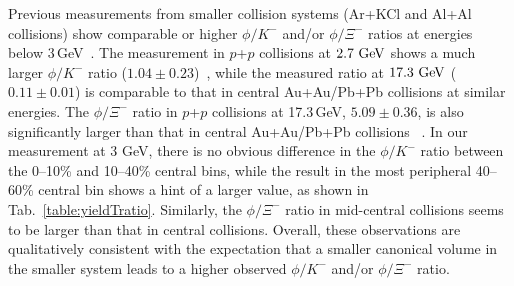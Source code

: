 \documentclass[%
 reprint,	
showpacs,
 amsmath,amssymb,
 aps,
 superscriptaddress,
]{revtex4-1}
\begin{document}
Previous measurements from smaller collision systems (Ar+KCl and Al+Al collisions) show comparable or higher $\phi/K^-$ and/or $\phi/\Xi^-$ ratios at energies below 3\,GeV~\cite{FOPI_phi_AlAl,FOPI_phi_NiNi,HADES_phi_ArKCl,Xi_ArKCl_HADES}. The measurement in $p$+$p$ collisions at $\textup{2.7 GeV}$ shows a much larger $\phi/K^-$ ratio ($1.04\pm0.23$)~\cite{ANKE_phi}, while the measured ratio at $\textup{17.3 GeV}$ ($0.11\pm0.01$) is comparable to that in central Au+Au/Pb+Pb collisions at similar energies. The $\phi/\Xi^-$ ratio in $p$+$p$ collisions at 17.3\,GeV, $5.09\pm0.36$, is also significantly larger than that in central Au+Au/Pb+Pb collisions ~\cite{NA61SHINE_pp_piKp,NA61SHINE_pp_phi,NA61SHINE_pp_Xi}. In our measurement at 3 GeV, there is no obvious difference in the $\phi/K^-$ ratio between the \textup{0--10\%} and \textup{10--40\%} central bins, while the result in the most peripheral 40--60\% central bin shows a hint of a larger value, as shown in Tab.~\ref{table:yieldTratio}. Similarly, the $\phi/\Xi^-$ ratio in mid-central collisions seems to be larger than that in central collisions. Overall, these observations are qualitatively consistent with the expectation that a smaller canonical volume in the smaller system leads to a higher observed $\phi/K^-$ and/or $\phi/\Xi^-$ ratio.
\end{document}
